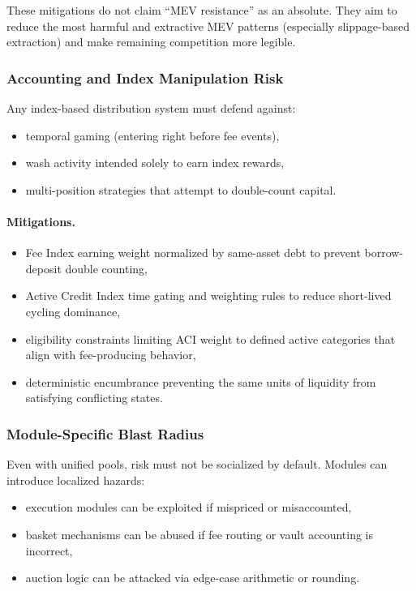 \documentclass[version=preprint]{iacrcc}
\begin{document}
These mitigations do not claim ``MEV resistance'' as an absolute. They aim to reduce the most harmful and extractive MEV patterns (especially slippage-based extraction) and make remaining competition more legible.

\subsubsection{Accounting and Index Manipulation Risk}

Any index-based distribution system must defend against:
\begin{itemize}
  \item temporal gaming (entering right before fee events),
  \item wash activity intended solely to earn index rewards,
  \item multi-position strategies that attempt to double-count capital.
\end{itemize}

\paragraph{Mitigations.}
\begin{itemize}
  \item Fee Index earning weight normalized by same-asset debt to prevent borrow-deposit double counting,
  \item Active Credit Index time gating and weighting rules to reduce short-lived cycling dominance,
  \item eligibility constraints limiting ACI weight to defined active categories that align with fee-producing behavior,
  \item deterministic encumbrance preventing the same units of liquidity from satisfying conflicting states.
\end{itemize}

\subsubsection{Module-Specific Blast Radius}

Even with unified pools, risk must not be socialized by default. Modules can introduce localized hazards:
\begin{itemize}
  \item execution modules can be exploited if mispriced or misaccounted,
  \item basket mechanisms can be abused if fee routing or vault accounting is incorrect,
  \item auction logic can be attacked via edge-case arithmetic or rounding.
\end{itemize}
\end{document}
